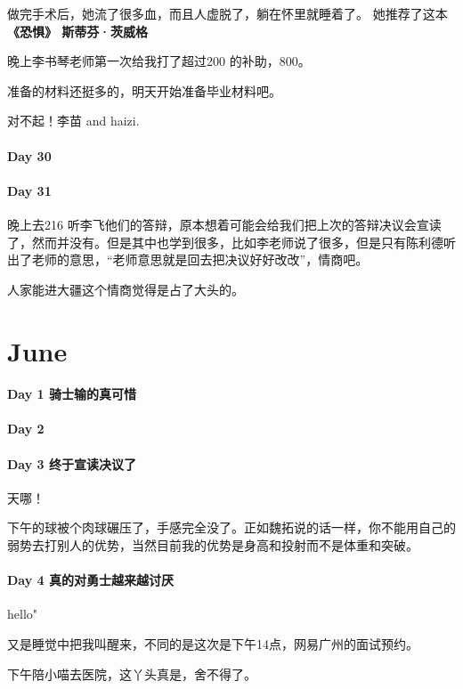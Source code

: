 \documentclass[UTF8,a4paper,8pt]{ctexart}
\begin{document}
 	 	做完手术后，她流了很多血，而且人虚脱了，躺在怀里就睡着了。 她推荐了这本 \textbf{《恐惧》 斯蒂芬·茨威格}
 	 	
 	 	晚上李书琴老师第一次给我打了超过200 的补助，800。
 	 	
 	 	准备的材料还挺多的，明天开始准备毕业材料吧。
 	 	
 	 	对不起！李苗 and  haizi.
 	 \paragraph{Day 30      \quad     }
 	 \paragraph{Day 31      \quad     }
 	 	晚上去216 听李飞他们的答辩，原本想着可能会给我们把上次的答辩决议会宣读了，然而并没有。但是其中也学到很多，比如李老师说了很多，但是只有陈利德听出了老师的意思，“老师意思就是回去把决议好好改改”，情商吧。
 	 	
 	 	人家能进大疆这个情商觉得是占了大头的。
 	 
\section{June}
 	 \paragraph{Day 1    骑士输的真可惜   \quad     }
 	 \paragraph{Day 2       \quad     }
 	 \paragraph{Day 3    终于宣读决议了   \quad     }
 	 	天哪！
 	 	
 	 	下午的球被个肉球碾压了，手感完全没了。正如魏拓说的话一样，你不能用自己的弱势去打别人的优势，当然目前我的优势是身高和投射而不是体重和突破。
 	 	
 	 \paragraph{Day 4    真的对勇士越来越讨厌   \quad     }
 	 	hello"
 	 	 	 	
 	 	又是睡觉中把我叫醒来，不同的是这次是下午14点，网易广州的面试预约。
 	 	
 	 	下午陪小喵去医院，这丫头真是，舍不得了。
 	 	
\end{document}
